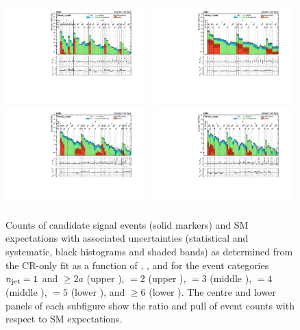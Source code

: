 \begin{figure}[!t]
  \centering
  \caption{Counts of candidate signal events (solid markers) and SM
    expectations with associated uncertainties (statistical and
    systematic, black histograms and shaded bands) as determined from
    the CR-only fit as a function of \nb, \scalht, and \mht for the
    event categories $n_{\text{jet}} = 1$ and ${\geq}2a$ (upper \cmsLeft), $=2$
    (upper \cmsRight), $=3$ (middle \cmsLeft), $=4$ (middle
    \cmsRight), $=5$ (lower \cmsLeft), and ${\geq}6$ (lower
    \cmsRight). The centre and lower panels of each subfigure show the
    ratio and pull of event counts with respect to SM expectations.}
  \includegraphics[width=0.48\textwidth, trim=10 0 60 10, clip=true]{Figures/1jet_cr-only.pdf}~ 
  \includegraphics[width=0.48\textwidth, trim=10 0 60 10, clip=true]{Figures/2jet_cr-only.pdf}\\
  \includegraphics[width=0.48\textwidth, trim=10 0 60 10, clip=true]{Figures/3jet_cr-only.pdf}~
  \includegraphics[width=0.48\textwidth, trim=10 0 60 10, clip=true]{Figures/4jet_cr-only.pdf}\\

\end{figure}
